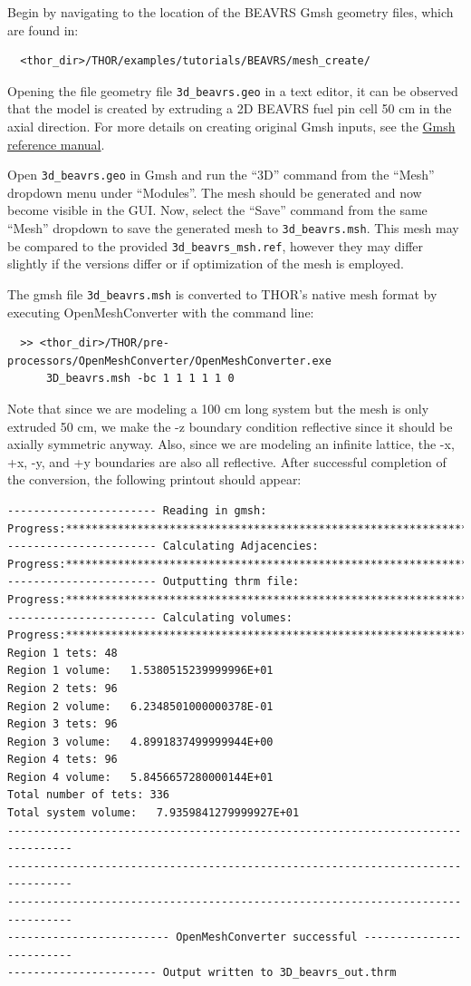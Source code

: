 Begin by navigating to the location of the BEAVRS Gmsh geometry files, which are found in:
\begin{verbatim}
  <thor_dir>/THOR/examples/tutorials/BEAVRS/mesh_create/
\end{verbatim}
Opening the file geometry file \verb"3d_beavrs.geo" in a text editor, it can be observed that the model is created by extruding a 2D BEAVRS fuel pin cell 50 cm in the axial direction.
For more details on creating original Gmsh inputs, see the \href{https://gmsh.info/doc/texinfo/gmsh.html}{Gmsh reference manual}.

Open \verb"3d_beavrs.geo" in Gmsh and run the ``3D'' command from the ``Mesh'' dropdown menu under ``Modules''.
The mesh should be generated and now become visible in the \ac{GUI}.
Now, select the ``Save'' command from the same ``Mesh'' dropdown to save the generated mesh to \verb"3d_beavrs.msh".
This mesh may be compared to the provided \verb"3d_beavrs_msh.ref", however they may differ slightly if the versions differ or if optimization of the mesh is employed.

The gmsh file \verb"3d_beavrs.msh" is converted to \ac{THOR}'s native mesh format by executing OpenMeshConverter with the command line:
\begin{verbatim}
  >> <thor_dir>/THOR/pre-processors/OpenMeshConverter/OpenMeshConverter.exe
      3D_beavrs.msh -bc 1 1 1 1 1 0
\end{verbatim}
Note that since we are modeling a 100 cm long system but the mesh is only extruded 50 cm, we make the -z boundary condition reflective since it should be axially symmetric anyway.
Also, since we are modeling an infinite lattice, the -x, +x, -y, and +y boundaries are also all reflective.
After successful completion of the conversion, the following printout should appear:
\begin{verbatim}
----------------------- Reading in gmsh:
Progress:***********************************************************************
----------------------- Calculating Adjacencies:
Progress:***********************************************************************
----------------------- Outputting thrm file:
Progress:***********************************************************************
----------------------- Calculating volumes:
Progress:***********************************************************************
Region 1 tets: 48
Region 1 volume:   1.5380515239999996E+01
Region 2 tets: 96
Region 2 volume:   6.2348501000000378E-01
Region 3 tets: 96
Region 3 volume:   4.8991837499999944E+00
Region 4 tets: 96
Region 4 volume:   5.8456657280000144E+01
Total number of tets: 336
Total system volume:   7.9359841279999927E+01
--------------------------------------------------------------------------------
--------------------------------------------------------------------------------
--------------------------------------------------------------------------------
------------------------- OpenMeshConverter successful -------------------------
----------------------- Output written to 3D_beavrs_out.thrm
\end{verbatim}

